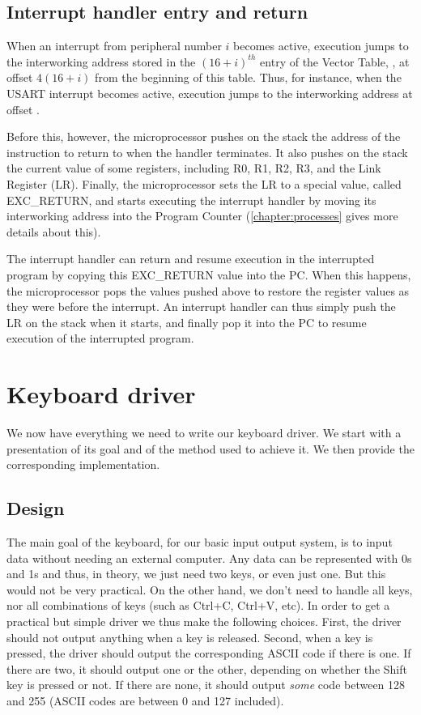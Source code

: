 \subsection{Interrupt handler entry and return}%
\label{subsection:interrupt-entry-return}

When an interrupt from peripheral number $i$ becomes active, execution jumps
to the interworking address stored in the $(16+i)^{th}$ entry of the Vector
Table, \ie, at offset $4(16+i)$ from the beginning of this table. Thus, for
instance, when the USART interrupt becomes active, execution jumps to the
interworking address at offset .

Before this, however, the microprocessor pushes on the stack the address of the
instruction to return to when the handler terminates. It also pushes on the
stack the current value of some registers, including R0, R1, R2, R3, and the
Link Register (LR). Finally, the microprocessor sets the LR to a special value,
called EXC\_RETURN, and starts executing the interrupt handler by moving its
interworking address into the Program Counter (\cref{chapter:processes} gives
more details about this).

The interrupt handler can return and resume execution in the interrupted
program by copying this EXC\_RETURN value into the PC. When this happens, the
microprocessor pops the values pushed above to restore the register values as
they were before the interrupt. An interrupt handler can thus simply push the
LR on the stack when it starts, and finally pop it into the PC to resume
execution of the interrupted program.

\section{Keyboard driver}

We now have everything we need to write our keyboard driver. We start with a
presentation of its goal and of the method used to achieve it. We then provide
the corresponding implementation.

\subsection{Design}\label{subsection:keyboard-driver-design}

The main goal of the keyboard, for our basic input output system, is to input
data without needing an external computer. Any data can be represented with 0s
and 1s and thus, in theory, we just need two keys, or even just one. But this
would not be very practical. On the other hand, we don't need to handle all
keys, nor all combinations of keys (such as Ctrl+C, Ctrl+V, etc). In order to
get a practical but simple driver we thus make the following choices. First,
the driver should not output anything when a key is released. Second, when a
key is pressed, the driver should output the corresponding ASCII code if there
is one. If there are two, it should output one or the other, depending on
whether the Shift key is pressed or not. If there are none, it should output
{\em some} code between 128 and 255 (ASCII codes are between 0 and 127
included).


